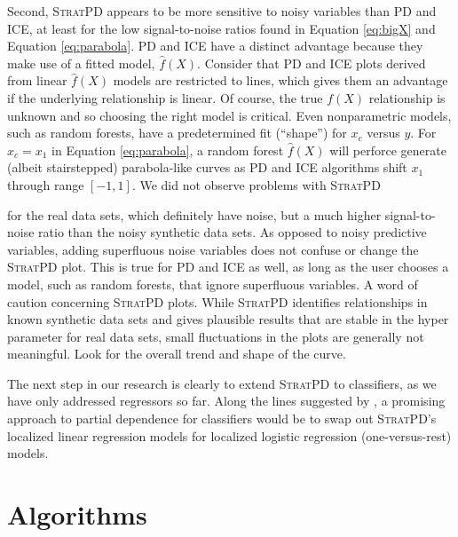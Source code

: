 \documentclass[12pt]{article}
\newcommand{\spd}{\fontfamily{cmr}\textsc{\small StratPD}}
\begin{document}
Second, \spd{} appears to be more sensitive to noisy variables than PD and ICE, at least for the low signal-to-noise ratios found in Equation \eqref{eq:bigX} and Equation \eqref{eq:parabola}. PD and ICE have a distinct advantage because they make use of a fitted model, $\widehat{f}(X)$.  Consider that PD and ICE plots derived from linear $\widehat{f}(X)$ models are restricted to lines, which gives them an advantage if the underlying relationship is linear. Of course, the true $f(X)$ relationship is unknown and so choosing the right model is critical. Even nonparametric models, such as random forests, have a predetermined fit (``shape'') for $x_c$ versus $y$. For $x_c=x_1$ in Equation \eqref{eq:parabola}, a random forest $\widehat{f}(X)$ will perforce generate (albeit stairstepped) parabola-like curves as PD and ICE algorithms shift $x_1$ through range $[-1,1]$. We did not observe problems with \spd{{} for the real data sets, which definitely have noise, but a much higher signal-to-noise ratio than the noisy synthetic data sets.  As opposed to noisy predictive variables, adding superfluous noise variables does not confuse or change the \spd{} plot.  This is true for PD and ICE as well, as long as the user chooses a model, such as random forests, that ignore  superfluous variables. A word of caution concerning \spd{} plots. While \spd{} identifies relationships in known synthetic data sets and gives plausible results that are stable in the hyper parameter for real data sets, small fluctuations in the plots are generally not meaningful. Look for the overall trend and shape of the curve.

The next step in our research is clearly to extend \spd{} to classifiers, as we have only addressed regressors so far.  Along the lines suggested by \cite{PDP}, a promising approach to partial dependence for classifiers would be to swap out \spd{}'s localized linear regression models for localized logistic regression (one-versus-rest) models.

\section{Algorithms}\label{sec:algorithms}

}
\end{document}
